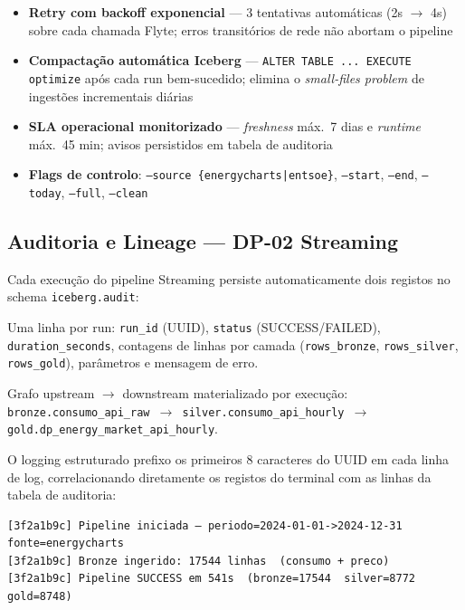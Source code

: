 \documentclass[11pt,a4paper]{article}
\begin{document}
\begin{itemize}[leftmargin=*,noitemsep]
  \item \textbf{Retry com backoff exponencial} --- 3 tentativas automáticas (2s $\rightarrow$ 4s) sobre cada chamada Flyte; erros transitórios de rede não abortam o pipeline
  \item \textbf{Compactação automática Iceberg} --- \texttt{ALTER TABLE ... EXECUTE optimize} após cada run bem-sucedido; elimina o \textit{small-files problem} de ingestões incrementais diárias
  \item \textbf{SLA operacional monitorizado} --- \textit{freshness} máx.\ 7 dias e \textit{runtime} máx.\ 45 min; avisos persistidos em tabela de auditoria
  \item \textbf{Flags de controlo}: \texttt{--source \{energycharts|entsoe\}}, \texttt{--start}, \texttt{--end}, \texttt{--today}, \texttt{--full}, \texttt{--clean}
\end{itemize}

\subsection{Auditoria e Lineage --- DP-02 Streaming}

Cada execução do pipeline Streaming persiste automaticamente dois registos no schema \texttt{iceberg.audit}:

\begin{description}[leftmargin=*]
  \item[\texttt{audit.pipeline\_runs}] Uma linha por run: \texttt{run\_id} (UUID), \texttt{status} (SUCCESS/FAILED), \texttt{duration\_seconds}, contagens de linhas por camada (\texttt{rows\_bronze}, \texttt{rows\_silver}, \texttt{rows\_gold}), parâmetros e mensagem de erro.
  \item[\texttt{audit.dataset\_lineage}] Grafo upstream $\rightarrow$ downstream materializado por execução: \texttt{bronze.consumo\_api\_raw $\rightarrow$ silver.consumo\_api\_hourly $\rightarrow$ gold.dp\_energy\_market\_api\_hourly}.
\end{description}

O logging estruturado prefixo os primeiros 8 caracteres do UUID em cada linha de log, correlacionando diretamente os registos do terminal com as linhas da tabela de auditoria:

\begin{lstlisting}
[3f2a1b9c] Pipeline iniciada — periodo=2024-01-01->2024-12-31  fonte=energycharts
[3f2a1b9c] Bronze ingerido: 17544 linhas  (consumo + preco)
[3f2a1b9c] Pipeline SUCCESS em 541s  (bronze=17544  silver=8772  gold=8748)
\end{lstlisting}
\end{document}
